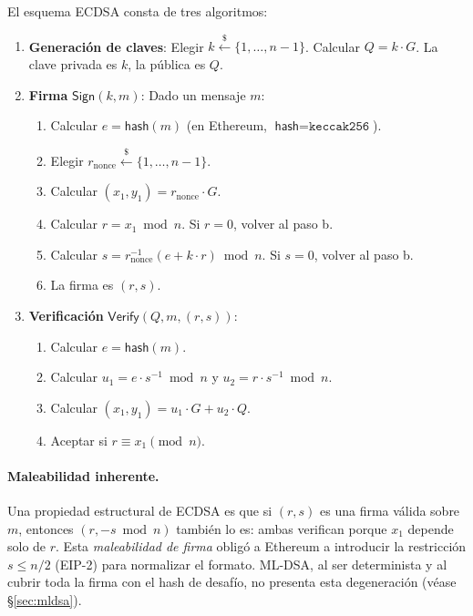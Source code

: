 El esquema ECDSA consta de tres algoritmos:

\begin{enumerate}
  \item \textbf{Generación de claves}: Elegir $k \xleftarrow{\$} \{1, \ldots, n-1\}$. Calcular $Q = k \cdot G$. La clave privada es $k$, la pública es $Q$.
  
  \item \textbf{Firma} $\textsf{Sign}(k, m)$: Dado un mensaje $m$:
  \begin{enumerate}[label=\alph*.]
    \item Calcular $e = \textsf{hash}(m)$ (en Ethereum, $\textsf{hash} = \texttt{keccak256}$).
    \item Elegir $r_\text{nonce} \xleftarrow{\$} \{1, \ldots, n-1\}$.
    \item Calcular $(x_1, y_1) = r_\text{nonce} \cdot G$.
    \item Calcular $r = x_1 \bmod n$. Si $r = 0$, volver al paso b.
    \item Calcular $s = r_\text{nonce}^{-1}(e + k \cdot r) \bmod n$. Si $s = 0$, volver al paso b.
    \item La firma es $(r, s)$.
  \end{enumerate}
  
  \item \textbf{Verificación} $\textsf{Verify}(Q, m, (r,s))$:
  \begin{enumerate}[label=\alph*.]
    \item Calcular $e = \textsf{hash}(m)$.
    \item Calcular $u_1 = e \cdot s^{-1} \bmod n$ y $u_2 = r \cdot s^{-1} \bmod n$.
    \item Calcular $(x_1, y_1) = u_1 \cdot G + u_2 \cdot Q$.
    \item Aceptar si $r \equiv x_1 \pmod{n}$.
  \end{enumerate}
\end{enumerate}

\paragraph{Maleabilidad inherente.} Una propiedad estructural de ECDSA es que si $(r, s)$ es una firma válida sobre $m$, entonces $(r, -s \bmod n)$ también lo es: ambas verifican porque $x_1$ depende solo de $r$. Esta \emph{maleabilidad de firma} obligó a Ethereum a introducir la restricción $s \leq n/2$ (EIP-2) para normalizar el formato. ML-DSA, al ser determinista y al cubrir toda la firma con el hash de desafío, no presenta esta degeneración (véase \S\ref{sec:mldsa}).

